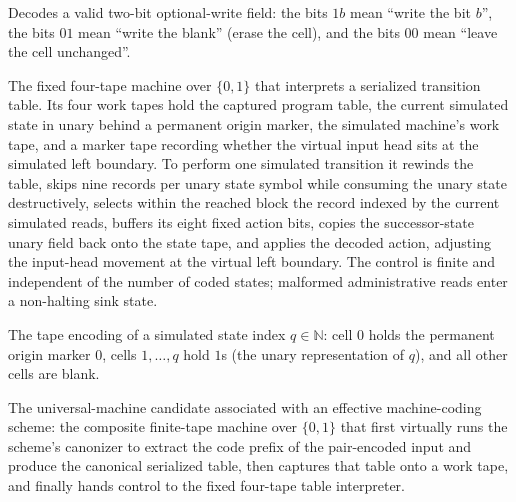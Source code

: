 \begin{definition}
\label{Turing.universalWrite}
\leanok
Decodes a valid two-bit optional-write field: the bits $1b$ mean ``write the
bit $b$'', the bits $01$ mean ``write the blank'' (erase the cell), and the
bits $00$ mean ``leave the cell unchanged''.
\end{definition}

\begin{definition}
\label{Turing.universalInterpreter}
\leanok
{}
The fixed four-tape machine over $\{0,1\}$ that interprets a serialized
transition table.  Its four work tapes hold the captured program table, the
current simulated state in unary behind a permanent origin marker, the
simulated machine's work tape, and a marker tape recording whether the
virtual input head sits at the simulated left boundary.  To perform one
simulated transition it rewinds the table, skips nine records per unary state
symbol while consuming the unary state destructively, selects within the
reached block the record indexed by the current simulated reads, buffers its
eight fixed action bits, copies the successor-state unary field back onto the
state tape, and applies the decoded action, adjusting the input-head movement
at the virtual left boundary.  The control is finite and independent of the
number of coded states; malformed administrative reads enter a non-halting
sink state.
\end{definition}

\begin{definition}
\label{Turing.universalStateTape}
\leanok
{}
The tape encoding of a simulated state index $q \in \mathbb{N}$: cell $0$
holds the permanent origin marker $0$, cells $1, \dots, q$ hold $1$s (the
unary representation of $q$), and all other cells are blank.
\end{definition}

\begin{definition}
\label{Turing.universalTM}
\leanok
{}
The universal-machine candidate associated with an effective machine-coding
scheme: the composite finite-tape machine over $\{0,1\}$ that first virtually
runs the scheme's canonizer to extract the code prefix of the pair-encoded
input and produce the canonical serialized table, then captures that table
onto a work tape, and finally hands control to the fixed four-tape table
interpreter.
\end{definition}

